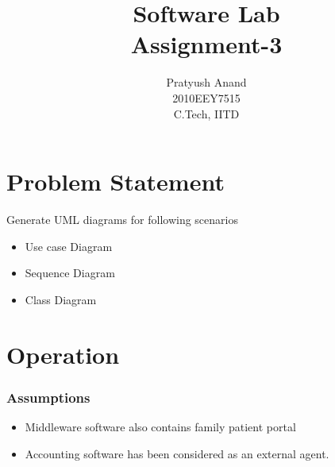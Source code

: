 \documentclass[a4paper,10pt]{report} %
\title{Software Lab \\Assignment-3}
\author{Pratyush Anand \\2010EEY7515 \\C.Tech, IITD}
\begin{document}
  \maketitle

  \chapter{Problem Statement}
    Generate UML diagrams for following scenarios
\begin{itemize}
 \item Use case Diagram
 \item Sequence Diagram
 \item Class Diagram
\end{itemize}

  \chapter{Operation}
\subsection {Assumptions}
\begin{itemize}
\item Middleware software also contains family patient portal
\item Accounting software has been considered as an external agent.
\end{itemize}
\end{document}
